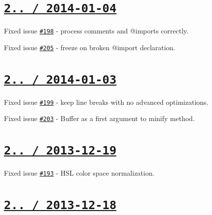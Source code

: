 \section*{\href{https://github.com/jakubpawlowicz/clean-css/compare/v2.0.5...v2.0.6}{\tt 2.. / 2014-\/01-\/04} }


\begin{DoxyItemize}
\item Fixed issue \href{https://github.com/jakubpawlowicz/clean-css/issues/198}{\tt \#198} -\/ process comments and {\ttfamily @import}s correctly.
\item Fixed issue \href{https://github.com/jakubpawlowicz/clean-css/issues/205}{\tt \#205} -\/ freeze on broken {\ttfamily @import} declaration.
\end{DoxyItemize}

\section*{\href{https://github.com/jakubpawlowicz/clean-css/compare/v2.0.4...v2.0.5}{\tt 2.. / 2014-\/01-\/03} }


\begin{DoxyItemize}
\item Fixed issue \href{https://github.com/jakubpawlowicz/clean-css/issues/199}{\tt \#199} -\/ keep line breaks with no advanced optimizations.
\item Fixed issue \href{https://github.com/jakubpawlowicz/clean-css/issues/203}{\tt \#203} -\/ Buffer as a first argument to minify method.
\end{DoxyItemize}

\section*{\href{https://github.com/jakubpawlowicz/clean-css/compare/v2.0.3...v2.0.4}{\tt 2.. / 2013-\/12-\/19} }


\begin{DoxyItemize}
\item Fixed issue \href{https://github.com/jakubpawlowicz/clean-css/issues/193}{\tt \#193} -\/ H\+SL color space normalization.
\end{DoxyItemize}

\section*{\href{https://github.com/jakubpawlowicz/clean-css/compare/v2.0.2...v2.0.3}{\tt 2.. / 2013-\/12-\/18} }


